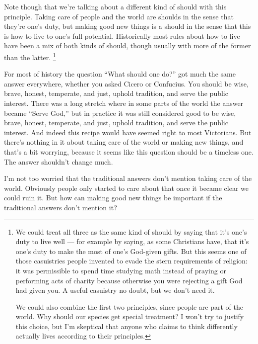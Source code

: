 \documentclass[12pt]{book}
\begin{document}
Note though that we're talking about a different kind of should with
this principle. Taking care of people and the world are shoulds in the
sense that they're one's duty, but making good new things is a should in
the sense that this is how to live to one's full potential. Historically
most rules about how to live have been a mix of both kinds of should,
though usually with more of the former than the latter.
\footnote{We could treat all three as the same kind of should by saying
that it's one's duty to live well --- for example by saying, as some
Christians have, that it's one's duty to make the most of one's
God-given gifts. But this seems one of those casuistries people invented
to evade the stern requirements of religion: it was permissible to spend
time studying math instead of praying or performing acts of charity
because otherwise you were rejecting a gift God had given you. A useful
casuistry no doubt, but we don't need it.

We could also combine the first two principles, since people are part of
the world. Why should our species get special treatment? I won't try to
justify this choice, but I'm skeptical that anyone who claims to think
differently actually lives according to their principles.}

For most of history the question ``What should one do?'' got much the
same answer everywhere, whether you asked Cicero or Confucius. You
should be wise, brave, honest, temperate, and just, uphold tradition,
and serve the public interest. There was a long stretch where in some
parts of the world the answer became ``Serve God,'' but in practice it
was still considered good to be wise, brave, honest, temperate, and
just, uphold tradition, and serve the public interest. And indeed this
recipe would have seemed right to most Victorians. But there's nothing
in it about taking care of the world or making new things, and that's a
bit worrying, because it seems like this question should be a timeless
one. The answer shouldn't change much.

I'm not too worried that the traditional answers don't mention taking
care of the world. Obviously people only started to care about that once
it became clear we could ruin it. But how can making good new things be
important if the traditional answers don't mention it?
\end{document}
